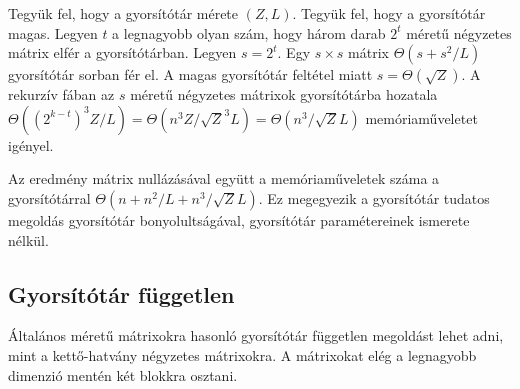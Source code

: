 \documentclass[12pt]{report}
\begin{document}
Tegyük fel, hogy a gyorsítótár mérete $(Z, L)$.
Tegyük fel, hogy a gyorsítótár magas.
Legyen $t$ a legnagyobb olyan szám, hogy három darab $2^t$ méretű négyzetes mátrix
elfér a gyorsítótárban.
Legyen $s=2^t$.
Egy $s \times s$ mátrix $\Theta(s+s^2/L)$ gyorsítótár sorban fér el.
A magas gyorsítótár feltétel miatt $s=\Theta(\sqrt{Z})$.
A rekurzív fában az $s$ méretű négyzetes mátrixok gyorsítótárba
hozatala $\Theta((2^{k-t})^3 Z/L) = \Theta(n^3Z/\sqrt{Z}^3L) = \Theta(n^3/\sqrt{Z}L)$ memóriaműveletet igényel.

Az eredmény mátrix nullázásával együtt a memóriaműveletek száma
a gyorsítótárral $\Theta(n+n^2/L+n^3/\sqrt{Z}L)$.
Ez megegyezik a gyorsítótár tudatos megoldás gyorsítótár bonyolultságával,
gyorsítótár paramétereinek ismerete nélkül.

\subsection{Gyorsítótár független}

Általános méretű mátrixokra hasonló gyorsítótár független
megoldást lehet adni, mint a kettő-hatvány négyzetes mátrixokra.
A mátrixokat elég a legnagyobb dimenzió mentén két blokkra osztani.
\end{document}
